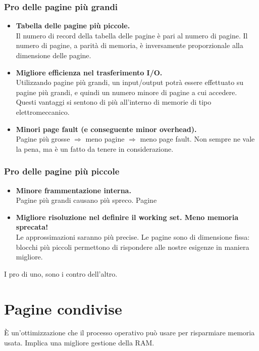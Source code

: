 \documentclass{report}
\begin{document}
\subsubsection{Pro delle pagine più grandi}
\begin{itemize}
    \item \textbf{Tabella delle pagine più piccole.}\\
    Il numero di record della tabella delle pagine è pari al numero di pagine. Il numero di pagine, a  parità di memoria, è inversamente proporzionale alla dimensione delle pagine.
    \item \textbf{Migliore efficienza nel trasferimento I/O.}\\
    Utilizzando pagine più grandi, un input/output potrà essere effettuato su pagine più grandi, e quindi un numero minore di pagine a cui accedere. Questi vantaggi si sentono di più all'interno di memorie di tipo elettromeccanico.
    \item \textbf{Minori page fault (e conseguente minor overhead).}\\
    Pagine più grosse $\Rightarrow$ meno pagine $\Rightarrow$ meno page fault. Non sempre ne vale la pena, ma è un fatto da tenere in considerazione.
\end{itemize}
\subsubsection{Pro delle pagine più piccole}
\begin{itemize}
    \item \textbf{Minore frammentazione interna.}\\
    Pagine più grandi causano più spreco. Pagine
    \item \textbf{Migliore risoluzione nel definire il working set. Meno memoria sprecata!}\\
    Le approssimazioni saranno più precise. Le pagine sono di dimensione fissa: blocchi più piccoli permettono di rispondere alle nostre esigenze in maniera migliore.
\end{itemize}

I pro di uno, sono i contro dell'altro.

\newpage

\section{Pagine condivise}
È un'ottimizzazione che il processo operativo può usare per risparmiare memoria usata. Implica una migliore gestione della RAM.
\end{document}
